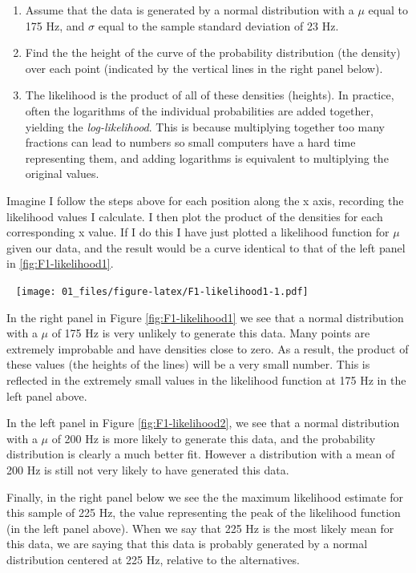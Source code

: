 \documentclass[
]{book}
\begin{document}
\begin{enumerate}
\def\labelenumi{\arabic{enumi})}
\item
  Assume that the data is generated by a normal distribution with a \(\mu\) equal to 175 Hz, and \(\sigma\) equal to the sample standard deviation of 23 Hz.
\item
  Find the the height of the curve of the probability distribution (the density) over each point (indicated by the vertical lines in the right panel below).
\item
  The likelihood is the product of all of these densities (heights). In practice, often the logarithms of the individual probabilities are added together, yielding the \emph{log-likelihood}. This is because multiplying together too many fractions can lead to numbers so small computers have a hard time representing them, and adding logarithms is equivalent to multiplying the original values.
\end{enumerate}

Imagine I follow the steps above for each position along the x axis, recording the likelihood values I calculate. I then plot the product of the densities for each corresponding x value. If I do this I have just plotted a likelihood function for \(\mu\) given our data, and the result would be a curve identical to that of the left panel in \ref{fig:F1-likelihood1}.

~
\texttt{[image: 01\_files/figure-latex/F1-likelihood1-1.pdf]}
~

In the right panel in Figure \ref{fig:F1-likelihood1} we see that a normal distribution with a \(\mu\) of 175 Hz is very unlikely to generate this data. Many points are extremely improbable and have densities close to zero. As a result, the product of these values (the heights of the lines) will be a very small number. This is reflected in the extremely small values in the likelihood function at 175 Hz in the left panel above.

In the left panel in Figure \ref{fig:F1-likelihood2}, we see that a normal distribution with a \(\mu\) of 200 Hz is more likely to generate this data, and the probability distribution is clearly a much better fit. However a distribution with a mean of 200 Hz is still not very likely to have generated this data.

Finally, in the right panel below we see the the maximum likelihood estimate for this sample of 225 Hz, the value representing the peak of the likelihood function (in the left panel above). When we say that 225 Hz is the most likely mean for this data, we are saying that this data is probably generated by a normal distribution centered at 225 Hz, relative to the alternatives.
\end{document}
